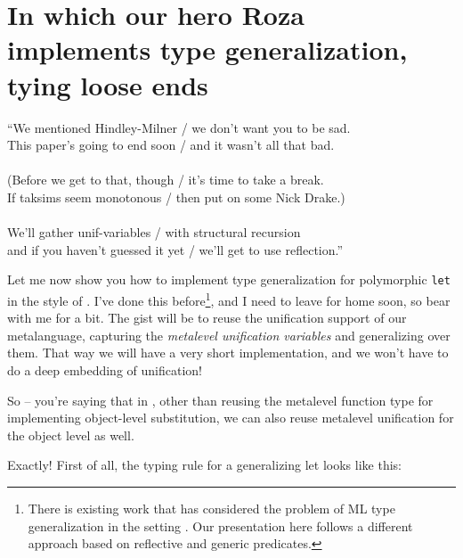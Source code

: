 \section{In which our hero Roza implements type generalization, tying
loose
ends}\label{in-which-our-hero-roza-implements-type-generalization-tying-loose-ends}

\begin{versy}
``We mentioned Hindley-Milner / we don't want you to be sad. \\
This paper's going to end soon / and it wasn't all that bad. \\
\hspace{1em}\vspace{-0.5em} \\
(Before we get to that, though / it's time to take a break. \\
If taksims seem monotonous / then put on some Nick Drake.) \\
\hspace{1em}\vspace{-0.5em} \\
We'll gather unif-variables / with structural recursion \\
and if you haven't guessed it yet / we'll get to use reflection.''
\end{versy}

\heroADVISOR{} Let me now show you how to implement type generalization for
polymorphic \texttt{let} in the style of
\citet{damas1984type,hindley1969principal,milner1978theory}. I've done
this
before\footnote{There is existing work that has considered the problem of ML type generalization
in the \lamprolog setting \citep{typgen-lamprolog-1,typgen-lamprolog-2}. Our presentation here follows a different approach based on reflective and generic predicates.},
and I need to leave for home soon, so bear with me for a bit. The gist
will be to reuse the unification support of our metalanguage, capturing
the \emph{metalevel unification variables} and generalizing over them.
That way we will have a very short implementation, and we won't have to
do a deep embedding of unification!

\heroSTUDENT{} So -- you're saying that in \lamprolog, other than reusing the
metalevel function type for implementing object-level substitution, we
can also reuse metalevel unification for the object level as well.

\identNormal

\heroADVISOR{} Exactly! First of all, the typing rule for a generalizing let
looks like this:

